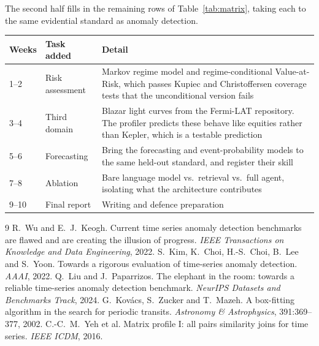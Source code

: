 \documentclass[11pt,a4paper]{article}
\begin{document}
The second half fills in the remaining rows of Table~\ref{tab:matrix}, taking
each to the same evidential standard as anomaly detection.

\begin{table}[h]
\centering\small
\begin{tabular}{@{}llp{7.6cm}@{}}
\toprule
\textbf{Weeks} & \textbf{Task added} & \textbf{Detail} \\
\midrule
1--2  & Risk assessment   & Markov regime model and regime-conditional
                            Value-at-Risk, which passes Kupiec and
                            Christoffersen coverage tests that the
                            unconditional version fails \\
3--4  & Third domain      & Blazar light curves from the Fermi-LAT repository.
                            The profiler predicts these behave like equities
                            rather than Kepler, which is a testable prediction \\
5--6  & Forecasting       & Bring the forecasting and event-probability models
                            to the same held-out standard, and register their
                            skill \\
7--8  & Ablation          & Bare language model vs.\ retrieval vs.\ full agent,
                            isolating what the architecture contributes \\
9--10 & Final report      & Writing and defence preparation \\
\bottomrule
\end{tabular}
\end{table}

\begin{thebibliography}{9}\small
{} R.~Wu and E.~J.~Keogh. Current time series anomaly detection
benchmarks are flawed and are creating the illusion of progress.
\emph{IEEE Transactions on Knowledge and Data Engineering}, 2022.
 S.~Kim, K.~Choi, H.-S.~Choi, B.~Lee and S.~Yoon. Towards a
rigorous evaluation of time-series anomaly detection. \emph{AAAI}, 2022.
 Q.~Liu and J.~Paparrizos. The elephant in the room: towards
a reliable time-series anomaly detection benchmark. \emph{NeurIPS Datasets and
Benchmarks Track}, 2024.
 G.~Kov\'acs, S.~Zucker and T.~Mazeh. A box-fitting
algorithm in the search for periodic transits. \emph{Astronomy \&
Astrophysics}, 391:369--377, 2002.
 C.-C.~M.~Yeh et al. Matrix profile I: all pairs similarity
joins for time series. \emph{IEEE ICDM}, 2016.
\end{thebibliography}
\end{document}
